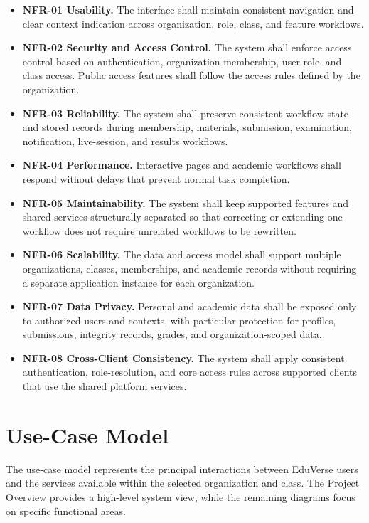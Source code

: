 \begin{itemize}
  \item \textbf{NFR-01 Usability.} The interface shall maintain consistent navigation and clear context indication across organization, role, class, and feature workflows.
  \item \textbf{NFR-02 Security and Access Control.} The system shall enforce access control based on authentication, organization membership, user role, and class access. Public access features shall follow the access rules defined by the organization.
  \item \textbf{NFR-03 Reliability.} The system shall preserve consistent workflow state and stored records during membership, materials, submission, examination, notification, live-session, and results workflows.
  \item \textbf{NFR-04 Performance.} Interactive pages and academic workflows shall respond without delays that prevent normal task completion.
  \item \textbf{NFR-05 Maintainability.} The system shall keep supported
    features and shared services structurally separated so that correcting or
    extending one workflow does not require unrelated workflows to be
    rewritten.
  \item \textbf{NFR-06 Scalability.} The data and access model shall support
    multiple organizations, classes, memberships, and academic records without
    requiring a separate application instance for each organization.
  \item \textbf{NFR-07 Data Privacy.} Personal and academic data shall be
    exposed only to authorized users and contexts, with particular protection
    for profiles, submissions, integrity records, grades, and
    organization-scoped data.
  \item \textbf{NFR-08 Cross-Client Consistency.} The system shall apply
    consistent authentication, role-resolution, and core access rules across
    supported clients that use the shared platform services.
\end{itemize}

\section{Use-Case Model}\label{sec:use_case_model}

The use-case model represents the principal interactions between EduVerse users and the services available within the selected organization and class.
The Project Overview provides a high-level system view, while the remaining
diagrams focus on specific functional areas.

